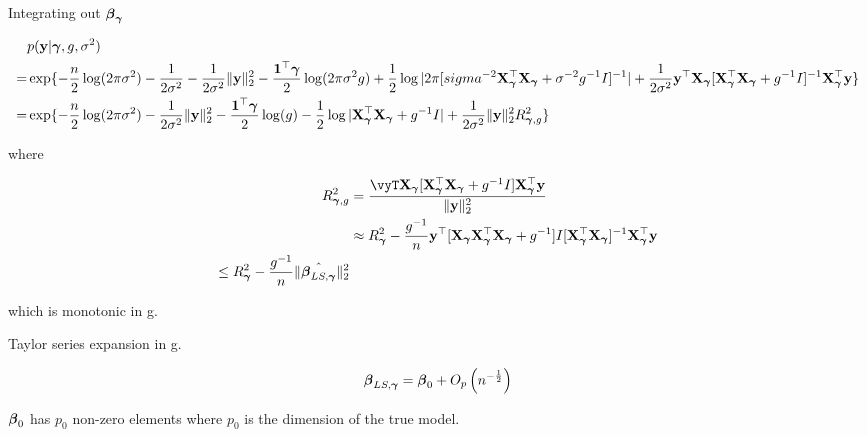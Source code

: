 \documentclass{amsart}
\begin{document}
Integrating out ${\boldsymbol \beta}_{\boldsymbol \gamma}$

\begin{align*}
&p({\bf y} | {\boldsymbol \gamma}, g, \sigma^2) \\
=& \exp\{-\frac{n}{2} \log(2 \pi \sigma^2) - \frac{1}{2 \sigma^2} - \frac{1}{2 \sigma^2} \|{\bf y}\|_2^2
				-\frac{{\bf 1}^\top {\boldsymbol\gamma}}{2} \log(2 \pi \sigma^2 g)
				+ \frac{1}{2} \log |2 \pi [sigma^{-2} {\bf X}_{\boldsymbol \gamma}^\top {\bf X}_{\boldsymbol \gamma} + \sigma^{-2} g^{-1} I]^{-1}|
				+ \frac{1}{2 \sigma^2} {\bf y}^\top {\bf X}_{\boldsymbol \gamma} [{\bf X}_{\boldsymbol \gamma}^\top {\bf X}_{\boldsymbol \gamma} + g^{-1} I]^{-1} {\bf X}_{\boldsymbol \gamma}^\top {\bf y}\} \\
=& \exp\{-\frac{n}{2} \log(2 \pi \sigma^2) - \frac{1}{2 \sigma^2} \|{\bf y}\|_2^2 - \frac{{\bf 1}^\top {\boldsymbol\gamma}}{2} \log(g)
				-\frac{1}{2} \log|{\bf X}_{\boldsymbol \gamma}^\top {\bf X}_{\boldsymbol \gamma} + g^{-1}I| + \frac{1}{2 \sigma^2} \|{\bf y}\|_2^2 R_{{\boldsymbol \gamma}, g}^2\}
\end{align*}

where

\begin{align*}
R_{\vgamma, g}^2 &= \frac{\vyT \mX_\vgamma [\mX_\vgamma^\top \mX_\vgamma + g^{-1} I] \mX_\vgamma^\top \vy}{\|\vy\|_2^2} \\
&\approx R_\vgamma^2 - \frac{g^{-1}}{n} \vy^\top [\mX_\vgamma \mX_\vgamma^\top \mX_\vgamma + g^{-1}] I [\mX_\vgamma^\top \mX_\vgamma]^{-1} \mX_\vgamma^\top \vy \\
\leq R_\vgamma^2 - \frac{g^{-1}}{n} \| \hat{\vbeta_{LS, \vgamma}} \|_2^2
\end{align*}

which is monotonic in g.

Taylor series expansion in g.

\begin{equation*}
{\boldsymbol\beta}_{LS, {\boldsymbol \gamma}} = {\boldsymbol \beta}_0 + O_p\left(n^{-\frac{1}{2}}\right)
\end{equation*}

${\boldsymbol \beta}_0$ has $p_0$ non-zero elements where $p_0$ is the dimension of the true model.
\end{document}
